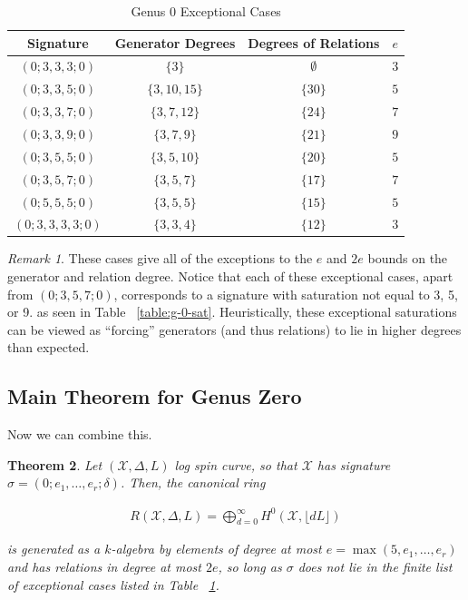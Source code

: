 \documentclass{amsart}
\theoremstyle{plain}
\newtheorem{thm}{Theorem}[section]
\theoremstyle{definition}
\theoremstyle{remark}
\newtheorem{rem}[thm]{Remark}
\numberwithin{equation}{section}
\newcommand\ssec{\subsection}
\newcommand \sx{\mathscr X}
\newcommand \halfcan{L}
\begin{document}
\begin{longtable}
	{| c || c | c | c |}
	\caption{Genus 0 Exceptional Cases}
	\label{table:g-0-exceptional}
	
	\tabularnewline
	
	\hline
	Signature & Generator Degrees & Degrees of Relations & $e$ \\
	\hline
	\hline

	$(0; 3, 3, 3; 0)$ & $\{3\}$ & $\emptyset$ & $3$ \\	\hline

	$(0; 3, 3, 5; 0)$ & $\{3, 10, 15\}$ & $\{30\}$ & $5$ \\	\hline
	
	$(0; 3, 3, 7; 0)$ & $\{3, 7, 12\}$ & $\{24\}$ & $7$ \\	\hline
	
	$(0; 3, 3, 9; 0)$ & $\{3, 7, 9\}$ & $\{21\}$ & $9$ \\	\hline
	
	$(0; 3, 5, 5; 0)$ & $\{3, 5, 10\}$ & $\{20\}$ & $5$ \\	\hline
	
	$(0; 3, 5, 7; 0)$ & $\{3, 5, 7\}$ & $\{17\}$ & $7$ \\	\hline
	
	$(0; 5, 5, 5; 0)$ & $\{3, 5, 5\}$ & $\{15\}$ & $5$ \\	\hline
	
	$(0; 3, 3, 3, 3; 0)$ & $\{3, 3, 4\}$ & $\{12\}$ & $3$ \\	\hline
\end{longtable}

\begin{rem}
These cases give all of the exceptions to the $e$ and $2e$ bounds on
the generator and relation degree. Notice that each of these
exceptional cases, apart from $(0; 3, 5, 7; 0)$, corresponds to a
signature with saturation not equal to
3, 5, or 9. as seen in Table ~\ref{table:g-0-sat}. Heuristically,
these exceptional saturations can be viewed as ``forcing'' generators
(and thus relations) to lie in higher degrees than expected.
\end{rem}

\ssec{Main Theorem for Genus Zero}
\label{ssec:g-0-main}
Now we can combine this.

\begin{thm}
\label{thm:g-0-main}
Let $(\sx, \Delta, \halfcan)$ log spin curve,
so that $\sx$ has signature $\sigma = (0; e_1, \ldots, e_r; \delta)$.
Then, the canonical ring

\begin{align*}
	R(\sx, \Delta, \halfcan) = \bigoplus_{d = 0}^\infty H^0(\sx, \lfloor d L \rfloor)
\end{align*}

\noindent
is generated as a $k$-algebra by elements of degree at most $e =
\max(5, e_1, \ldots, e_r)$ and has relations in degree at most $2e$,
so long as $\sigma$ does not lie in the finite list of exceptional
cases listed in Table ~\ref{table:g-0-exceptional}.
\end{thm}
\end{document}
